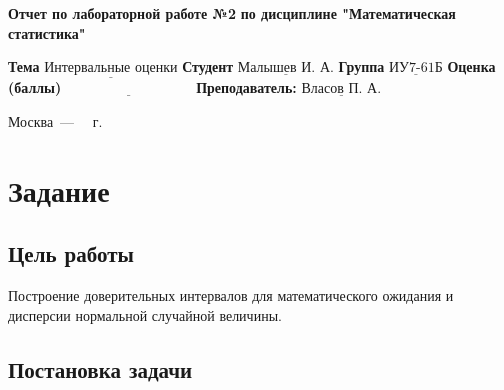 \documentclass[12pt]{report}
\begin{document}
\begin{titlepage}
		
		\begin{center}
			\noindent\begin{minipage}{1.3\textwidth}\centering
				\Large\textbf{  Отчет по лабораторной работе №2}\newline
				\textbf{по дисциплине \newline "Математическая статистика"}\newline\newline
			\end{minipage}
		\end{center}
		
		\noindent\textbf{Тема} $\underline{\text{Интервальные оценки}}$\newline\newline
		\noindent\textbf{Студент} $\underline{\text{Малышев И. А.}}$\newline\newline
		\noindent\textbf{Группа} $\underline{\text{ИУ7-61Б}}$\newline\newline
		\noindent\textbf{Оценка (баллы)} $\underline{\text{~~~~~~~~~~~~~~~~~~~~~~~~~~~}}$\newline\newline
		\noindent\textbf{Преподаватель: } $\underline{\text{Власов П. А.}}$\newline\newline\newline
		
		\begin{center}
			\vfill
			Москва~---~\the\year
			~г.
		\end{center}
	\end{titlepage}
	
\setcounter{page}{2}

\chapter*{Задание}

\section*{Цель работы}
Построение доверительных интервалов для математического ожидания и дисперсии нормальной случайной величины.

\section*{Постановка задачи}
\end{document}
